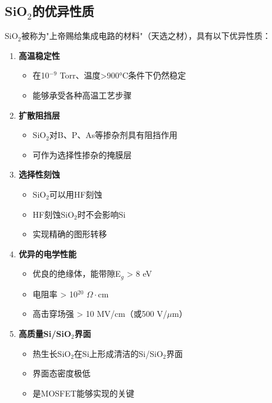 \documentclass[UTF8,12pt,a4paper]{ctexart}
\begin{document}
\subsection{SiO$_2$的优异性质}

SiO$_2$被称为"上帝赐给集成电路的材料"（天选之材），具有以下优异性质：

\begin{enumerate}
    \item \textbf{高温稳定性}
    \begin{itemize}
        \item 在10$^{-9}$ Torr、温度>900°C条件下仍然稳定
        \item 能够承受各种高温工艺步骤
    \end{itemize}
    
    \item \textbf{扩散阻挡层}
    \begin{itemize}
        \item SiO$_2$对B、P、As等掺杂剂具有阻挡作用
        \item 可作为选择性掺杂的掩膜层
    \end{itemize}
    
    \item \textbf{选择性刻蚀}
    \begin{itemize}
        \item SiO$_2$可以用HF刻蚀
        \item HF刻蚀SiO$_2$时不会影响Si
        \item 实现精确的图形转移
    \end{itemize}
    
    \item \textbf{优异的电学性能}
    \begin{itemize}
        \item 优良的绝缘体，能带隙E$_g$ > 8 eV
        \item 电阻率 > 10$^{20}$ $\Omega \cdot$cm
        \item 高击穿场强 > 10 MV/cm（或500 V/$\mu$m）
    \end{itemize}
    
    \item \textbf{高质量Si/SiO$_2$界面}
    \begin{itemize}
        \item 热生长SiO$_2$在Si上形成清洁的Si/SiO$_2$界面
        \item 界面态密度极低
        \item 是MOSFET能够实现的关键
    \end{itemize}
\end{enumerate}
\newpage
\end{document}
